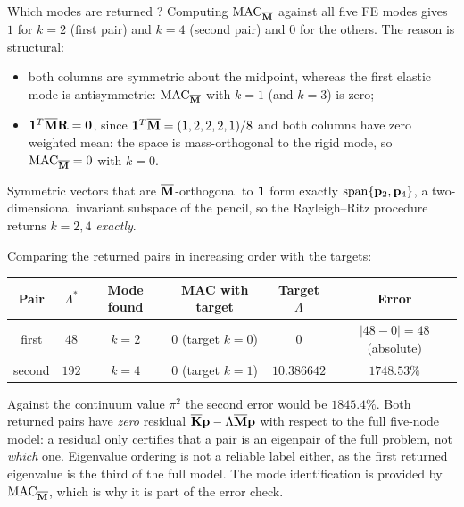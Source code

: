 \documentclass[12pt]{article}
\begin{document}
\begin{enumerate}
          Which modes are returned ? Computing $\mathrm{MAC}_{\overline{\mathbf M}}$ against all five FE modes gives $1$ for $k=2$ (first pair) and $k=4$ (second pair) and $0$ for the others. The reason is structural:
          \begin{itemize}
              \item both columns are symmetric about the midpoint, whereas the first elastic mode is antisymmetric: $\mathrm{MAC}_{\overline{\mathbf M}}$ with $k=1$ (and $k=3$) is zero;
              \item $\mathbf{1}^{T}\overline{\mathbf M}\mathbf{R}=\mathbf{0}$, since $\mathbf{1}^{T}\overline{\mathbf M}=(1,2,2,2,1)/8$ and both columns have zero weighted mean: the space is mass-orthogonal to the rigid mode, so $\mathrm{MAC}_{\overline{\mathbf M}}=0$ with $k=0$.
          \end{itemize}
          Symmetric vectors that are $\overline{\mathbf M}$-orthogonal to $\mathbf{1}$ form exactly $\mathrm{span}\{\mathbf{p}_2,\mathbf{p}_4\}$, a two-dimensional invariant subspace of the pencil, so the Rayleigh--Ritz procedure returns $k=2,4$ \emph{exactly}.

          Comparing the returned pairs in increasing order with the targets:
          \begin{center}
              \small\setlength{\tabcolsep}{3pt}
              \begin{tabular}{@{}cccccc@{}}
                  \toprule
                  Pair   & $\Lambda^*$ & Mode found & MAC with target    & Target $\Lambda$ & Error                  \\
                  \midrule
                  first  & $48$        & $k=2$      & $0$ (target $k=0$) & $0$              & $|48-0|=48$ (absolute) \\
                  second & $192$       & $k=4$      & $0$ (target $k=1$) & $10.386642$      & $1748.53\%$            \\
                  \bottomrule
              \end{tabular}
          \end{center}
          Against the continuum value $\pi^2$ the second error would be $1845.4\%$. Both returned pairs have \emph{zero} residual $\overline{\mathbf K}\mathbf{p}-\Lambda\overline{\mathbf M}\mathbf{p}$ with respect to the full five-node model: a residual only certifies that a pair is an eigenpair of the full problem, not \emph{which} one. Eigenvalue ordering is not a reliable label either, as the first returned eigenvalue is the third of the full model. The mode identification is provided by $\mathrm{MAC}_{\overline{\mathbf M}}$, which is why it is part of the error check.


\end{enumerate}
\end{document}
